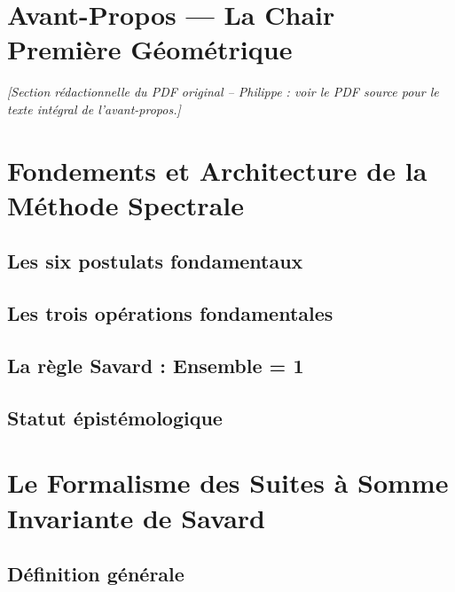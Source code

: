 \documentclass[11pt,a4paper]{article}
\begin{document}
\newpage
\tableofcontents
\newpage

\section*{Avant-Propos --- La Chair Première Géométrique}

\emph{[Section rédactionnelle du PDF original -- Philippe : voir le PDF source pour le texte intégral de l'avant-propos.]}

\section{Fondements et Architecture de la Méthode Spectrale}

\subsection{Les six postulats fondamentaux}
\subsection{Les trois opérations fondamentales}
\subsection{La règle Savard : Ensemble = 1}
\subsection{Statut épistémologique}

\section{Le Formalisme des Suites à Somme Invariante de Savard}

\subsection{Définition générale}
\end{document}
